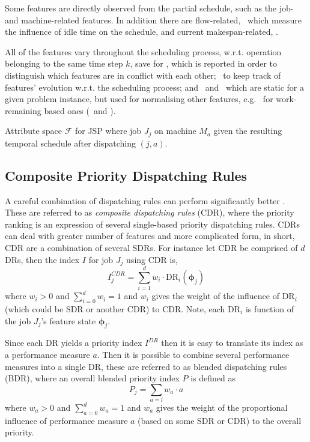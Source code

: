 \documentclass[smallextended]{svjour3}
\renewcommand{\vphi}{\bm \phi}
\begin{document}
	Some features are directly observed from the partial schedule, such as the job- and machine-related features. 
	In addition there are 
	flow-related, \phiFlowRelated\, which measure the influence of idle time on the schedule, 
	and current makespan-related, \phiScheduleRelated.
	
	All of the features vary throughout the scheduling process, w.r.t. operation belonging to the same time step $k$, save for \phimac, 
	which is reported in order to distinguish which features are in conflict with each other; \phistep\ to keep track of features' evolution w.r.t. the scheduling process; and \phitotalProc\ and \phiwrmTotal\ which are static for a given problem instance, but used for normalising other features, e.g. \phiwrmTotal\ for  work-remaining based ones (\phiwrmJob\ and \phiwrmMac). 
	
	\begin{table}[t]  \centering
		\caption[Attribute space $\mathcal{F}$ for JPS]{Attribute space $\mathcal{F}$ for JSP where job $J_j$ on machine $M_a$ given the resulting temporal schedule after dispatching $(j,a)$.
		}
		\label{tbl:jssp:feat}
		
	\end{table}
	
	\subsection{Composite Priority Dispatching Rules}\label{sec:CDR}
	A careful combination of dispatching rules can perform significantly better \cite{Jayamohan04}. These are referred to as \emph{composite dispatching rules} (CDR), where the priority ranking is an expression of several single-based priority dispatching rules. CDRs can deal with greater number of features and more complicated form, in short, CDR are a combination of several SDRs. For instance let CDR be comprised of $d$ DRs, then the index $I$ for job $J_j$ using CDR is, 
	\begin{equation}
	I_j^{CDR} = \sum_{i=1}^d w_i \cdot \text{DR}_i(\vphi_j) \label{eq:CDR}
	\end{equation}
	where $w_i>0$ and $\sum_{i=0}^d w_i = 1$ and $w_i$ gives the weight of the influence of $\text{DR}_i$ (which could be SDR or another CDR) to CDR. Note, each $\text{DR}_i$ is function of the job $J_j$'s feature state $\vphi_j$.

	Since each DR yields a priority index $I^{DR}$ then it is easy to translate its index as a  performance measure $a$. Then it is possible to combine several performance measures into a single DR, these are referred to as blended dispatching rules (BDR), where an overall blended priority index $P$ is defined as 
	\begin{equation}
	P_j = \sum_{a=l} w_a \cdot a 
	\end{equation}
	where $w_a>0$ and $\sum_{a=0}^d w_a = 1$ and $w_a$ gives the weight of the proportional influence of performance measure $a$ (based on some SDR or CDR) to the overall priority.
	
\end{document}
